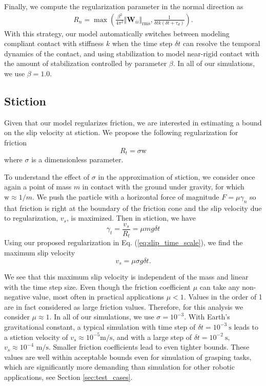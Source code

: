 Finally, we compute the regularization parameter in the normal direction as
\begin{eqnarray}
    R_n = \max\left(\frac{\beta^2}{4\pi^2}\Vert\mathbf{W}_{ii}\Vert_\text{rms}, 
    \frac{1}{\delta t k(\delta t+\tau_d)}\right)
    \label{eq:normal_regularization}.
\end{eqnarray}
With this strategy, our model automatically switches between modeling compliant
contact with stiffness $k$ when the time step $\delta t$ can resolve the
temporal dynamics of the contact, and using stabilization to model near-rigid
contact with the amount of stabilization controlled by parameter
$\beta$. In all of our simulations, we use $\beta=1.0$.

\subsection{Stiction}
Given that our model regularizes friction, we are interested in estimating a bound on
the slip velocity at stiction. We propose the following regularization for friction
\begin{equation}
    R_t = \sigma \text{w}
    \label{eq:slip_time_scale}
\end{equation}
where $\sigma$ is a dimensionless parameter.

To understand the effect of $\sigma$ in the approximation of stiction, we
consider once again a point of mass $m$ in contact with the ground under gravity,
for which $\text{w}\approx 1/m$. We push the particle with a horizontal force of magnitude
$F=\mu\gamma_n$ so that friction is right at the boundary of the friction cone and
the slip velocity due to regularization, $v_s$, is maximized. Then in stiction, we have
\begin{equation}
    \gamma_t = \frac{v_s}{R_t} = \mu m g \delta t
\end{equation}
Using our proposed regularization in Eq. (\ref{eq:slip_time_scale}), we find
the maximum slip velocity
\begin{equation}
    v_s = \mu\sigma g \delta t.
    \label{eq:slip_estimation}
\end{equation}

We see that this maximum slip velocity is independent of the mass and linear
with the time step size. Even though the friction coefficient $\mu$ can take any
non-negative value, most often in practical applications $\mu < 1$. Values in the
order of 1 are in fact considered as large friction values. Therefore, for this
analysis we consider $\mu\approx 1$.
In all of our simulations, we use $\sigma=10^{-3}$. With
Earth's gravitational constant, a typical simulation with time step of $\delta
t=10^{-3}~\text{s}$ leads to a stiction velocity of $v_s\approx
10^{-5}\text{m}/\text{s}$, and with a large step of $\delta t=10^{-2}~\text{s}$,
$v_s\approx 10^{-4}\text{ m}/\text{s}$. Smaller friction coefficients lead to
even tighter bounds. These values are well within acceptable bounds even for
simulation of grasping tasks, which are significantly more demanding than
simulation for other robotic applications, see Section \ref{sec:test_cases}.

